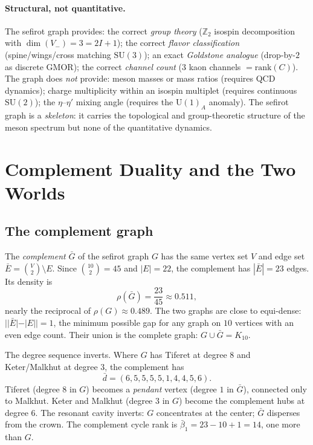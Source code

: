 \documentclass[11pt,a4paper]{amsart}
\theoremstyle{remark}
\newcommand{\bbZ}{\mathbb{Z}}
\newcommand{\rank}{\mathrm{rank}}
\begin{document}
\paragraph{Structural, not quantitative.}
The sefirot graph provides: the correct \emph{group theory} ($\bbZ_2$
isospin decomposition with $\dim(V_-) = 3 = 2I + 1$); the correct
\emph{flavor classification} (spine/wings/cross matching $\mathrm{SU}(3)$);
an exact \emph{Goldstone analogue} (drop-by-$2$ as discrete GMOR); the
correct \emph{channel count} ($3$ kaon channels $= \rank(C)$). The graph
does \emph{not} provide: meson masses or mass ratios (requires QCD
dynamics); charge multiplicity within an isospin multiplet (requires
continuous $\mathrm{SU}(2)$); the $\eta$--$\eta'$ mixing angle (requires
the $\mathrm{U}(1)_A$ anomaly). The sefirot graph is a \emph{skeleton}: it
carries the topological and group-theoretic structure of the meson
spectrum but none of the quantitative dynamics.

\section{Complement Duality and the Two Worlds}
\label{sec:complement}

\subsection{The complement graph}
\label{sec:complement-def}

The \emph{complement} $\bar{G}$ of the sefirot graph $G$ has the same
vertex set $V$ and edge set $\bar{E} = \binom{V}{2} \setminus E$. Since
$\binom{10}{2} = 45$ and $|E| = 22$, the complement has $|\bar{E}| = 23$
edges. Its density is
\begin{equation}
\rho(\bar{G}) = \frac{23}{45} \approx 0.511,
\end{equation}
nearly the reciprocal of $\rho(G) \approx 0.489$. The two graphs are close
to equi-dense: $||\bar{E}| - |E|| = 1$, the minimum possible gap for any
graph on $10$ vertices with an even edge count. Their union is the complete
graph: $G \cup \bar{G} = K_{10}$.

The degree sequence inverts. Where $G$ has Tiferet at degree $8$ and
Keter/Malkhut at degree $3$, the complement has
\begin{equation}
\bar{d} = (6, 5, 5, 5, 5, 1, 4, 4, 5, 6).
\end{equation}
Tiferet (degree $8$ in $G$) becomes a \emph{pendant} vertex (degree $1$ in
$\bar{G}$), connected only to Malkhut. Keter and Malkhut (degree $3$ in
$G$) become the complement hubs at degree $6$. The resonant cavity inverts:
$G$ concentrates at the center; $\bar{G}$ disperses from the crown. The
complement cycle rank is $\bar{\beta}_1 = 23 - 10 + 1 = 14$, one more than
$G$.
\end{document}
